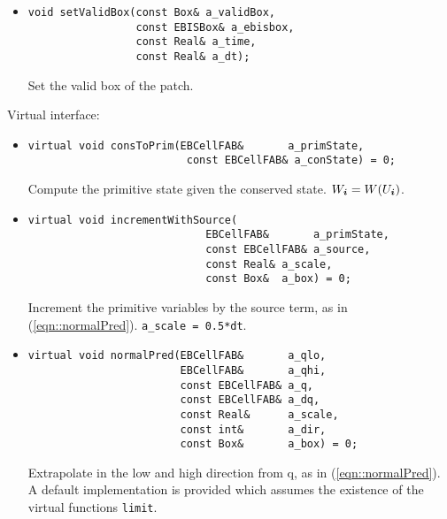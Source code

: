 \begin{itemize}
\item \begin{small}\begin{verbatim}
void setValidBox(const Box& a_validBox,
                 const EBISBox& a_ebisbox,
                 const Real& a_time,
                 const Real& a_dt);
\end{verbatim}\end{small}
Set the valid box of the patch.
\end{itemize}
\noindent
Virtual interface:
\begin{itemize}

\item \begin{small}\begin{verbatim}
virtual void consToPrim(EBCellFAB&       a_primState,
                         const EBCellFAB& a_conState) = 0;
\end{verbatim}\end{small}
Compute the primitive state given the conserved state.
$W_{\boldsymbol{i}} = W(U_{\boldsymbol{i}})$.
\item \begin{small}\begin{verbatim}
virtual void incrementWithSource(
                            EBCellFAB&       a_primState,
                            const EBCellFAB& a_source,
                            const Real& a_scale,
                            const Box&  a_box) = 0;
\end{verbatim}\end{small}
Increment the primitive variables by the source term, as in
(\ref{eqn::normalPred}).  \verb/a_scale = 0.5*dt/.

\item \begin{small}\begin{verbatim}
virtual void normalPred(EBCellFAB&       a_qlo,
                        EBCellFAB&       a_qhi,
                        const EBCellFAB& a_q,
                        const EBCellFAB& a_dq,
                        const Real&      a_scale,
                        const int&       a_dir,
                        const Box&       a_box) = 0;
\end{verbatim}\end{small}

Extrapolate in the low and high direction from q, as in 
(\ref{eqn::normalPred}).
A default implementation is provided which assumes the existence of the
virtual functions \verb/limit/.


\end{itemize}
